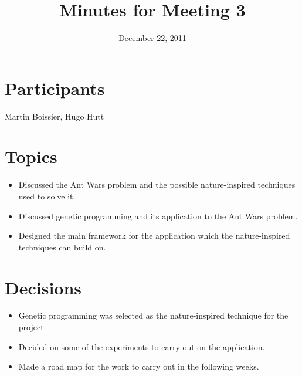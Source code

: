 \documentclass[a4paper, 11pt]{article}
\date{December 22, 2011}
\title{Minutes for Meeting 3}
\begin{document}
\maketitle

\section{Participants}

Martin Boissier, Hugo Hutt

\section{Topics}

\begin{itemize}
\item Discussed the Ant Wars problem and the possible nature-inspired
  techniques used to solve it.
\item Discussed genetic programming and its application to the Ant
  Wars problem.
\item Designed the main framework for the application which the
  nature-inspired techniques can build on.
\end{itemize}

\section{Decisions}

\begin{itemize}
\item Genetic programming was selected as the nature-inspired
  technique for the project.
\item Decided on some of the experiments to carry out on the
  application.
\item Made a road map for the work to carry out in the following weeks.
\end{itemize}
\end{document}
